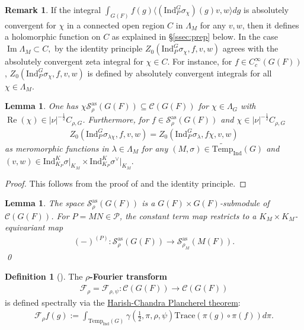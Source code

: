 \documentclass[10pt]{amsart}
\newtheorem{lemma}[theorem]{Lemma}
\theoremstyle{definition}
\newtheorem{remark}[theorem]{Remark}
\newtheorem{definition}[theorem]{Definition}
\numberwithin{equation}{section}
\numberwithin{equation}{subsection}
\newcommand{\Ind}{\mathrm{Ind}}
\newcommand{\Temp}{\mathrm{Temp}}
\renewcommand{\Im}{\mathop{\mathrm{Im}}}
\renewcommand{\Re}{\mathop{\mathrm{Re}}}
\begin{document}
\begin{remark}
    If the integral $\int_{G(F)} f(g)\langle (\Ind_P^G\sigma_\chi)(g)v,w \rangle dg$ is absolutely convergent for $\chi$ in a connected open region $C$ in $\Lambda_M$ for any $v,w$, then it defines a holomorphic function on $C$ as explained in \S \ref{ssec:prep} below. In the case $\Im \Lambda_M\subset C,$ by the identity principle $Z_0(\Ind_P^G\sigma_\chi,f,v,w)$ agrees with the absolutely convergent zeta integral for $\chi\in C$. For instance, for $f\in C^\infty_c(G(F))$, $Z_0(\Ind_P^G\sigma_\chi,f,v,w)$ is defined by absolutely convergent integrals for all $\chi\in \Lambda_M.$
\end{remark}

\begin{lemma}\label{Sas:twist:HC} One has $\chi\mathcal{S}^{\mathrm{as}}_\rho(G(F))\subseteq \mathcal{C}(G(F))$ for $\chi\in \Lambda_G$ with $\Re(\chi)\in |\nu|^{-\frac{1}{2}}C_{\rho,G}$. Furthermore, for $f\in \mathcal{S}^{\mathrm{as}}_\rho(G(F))$ and $\chi\in |\nu|^{-\frac{1}{2}}C_{\rho,G}$
\begin{align*}
    Z_0(\mathrm{Ind}_P^G \sigma_{\lambda\chi},f,v,w)=Z_0(\mathrm{Ind}_P^G \sigma_\lambda,f\chi,v,w)
\end{align*}
as meromorphic functions in $\lambda\in \Lambda_M$ for any $(M,\sigma)\in\widetilde{\Temp}_\Ind(G)$ and $(v,w)\in \Ind_{K_P}^K\sigma\vert_{K_M}\times \Ind_{K_P}^K\sigma^\vee\vert_{K_M}.$
\end{lemma}

\begin{proof}
     This follows from the proof of \cite[Lemma 5.10]{DRS} and the identity principle.
\end{proof}

 \begin{lemma}\label{Sas:FT+constant} The space $\mathcal{S}_\rho^{\mathrm{as}}(G(F))$ is a $G(F)\times G(F)$-submodule of $\mathcal{C}(G(F))$. For $P=MN\in \mathcal{P}$, the constant term map restricts to a $K_M\times K_M$-equivariant map
\begin{align*}
    (-)^{(P)}:\mathcal{S}^{\mathrm{as}}_{\rho}(G(F))\longrightarrow \mathcal{S}^{\mathrm{as}}_{\rho_M}(M(F)).
\end{align*}
\qed
\end{lemma}


\begin{definition}[{\cite[\S4]{DRS}}] The \textbf{$\rho$-Fourier transform} 
\begin{align*}
    \mathcal{F}_{\rho}=\mathcal{F}_{\rho,\psi}:\mathcal{C}(G(F))\to\mathcal{C}(G(F))
\end{align*}
is defined spectrally via the \hyperref[HCPlan]{Harish-Chandra Plancherel theorem}:
\begin{align*}
    \mathcal{F}_\rho f (g) := \int_{\Temp_\Ind(G)} \gamma(\tfrac{1}{2},\pi,\rho,\psi)\mathrm{Trace}(\pi(g)\circ \pi(f)) d\pi.
\end{align*}
    \end{definition}
\end{document}
